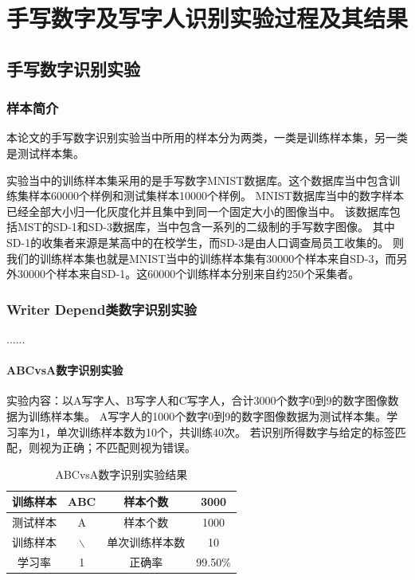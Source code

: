 \section{手写数字及写字人识别实验过程及其结果}

\subsection{手写数字识别实验}

\subsubsection{样本简介}
本论文的手写数字识别实验当中所用的样本分为两类，一类是训练样本集，另一类是测试样本集。

实验当中的训练样本集采用的是手写数字MNIST数据库。这个数据库当中包含训练集样本60000个样例和测试集样本10000个样例。
MNIST数据库当中的数字样本已经全部大小归一化灰度化并且集中到同一个固定大小的图像当中。
该数据库包括MST的SD-1和SD-3数据库，当中包含一系列的二级制的手写数字图像。
其中SD-1的收集者来源是某高中的在校学生，而SD-3是由人口调查局员工收集的。
则我们的训练样本集也就是MNIST当中的训练样本集有30000个样本来自SD-3，而另外30000个样本来自SD-1。这60000个训练样本分别来自约250个采集者。

\subsubsection{Writer Depend类数字识别实验}
......

\paragraph{ABCvsA数字识别实验}
实验内容：以A写字人、B写字人和C写字人，合计3000个数字0到9的数字图像数据为训练样本集。
A写字人的1000个数字0到9的数字图像数据为测试样本集。学习率为1，单次训练样本数为10个，共训练40次。
若识别所得数字与给定的标签匹配，则视为正确；不匹配则视为错误。
\begin{table}[!htbp]
    \centering
    \caption{ABCvsA数字识别实验结果}
    \begin{tabular}[\textwidth]{c|c|c|c}
        \hline
        训练样本 & ABC & 样本个数 & 3000 \\
        \hline
        测试样本 & A & 样本个数 & 1000 \\
        \hline
        训练样本 & $\backslash$ & 单次训练样本数 & 10 \\
        \hline
        学习率 & 1 & 正确率 & 99.50\% \\
        \hline
    \end{tabular}
\end{table}

